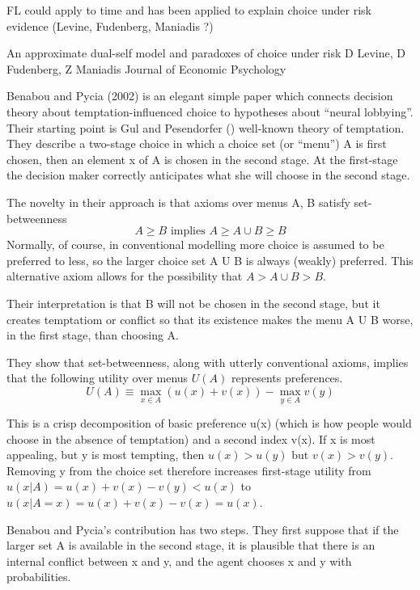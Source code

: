 \documentclass{article}
\begin{document}
FL could apply to time and has been applied to explain choice under risk evidence (Levine, Fudenberg, Maniadis ?)

An approximate dual-self model and paradoxes of choice under risk
D Levine, D Fudenberg, Z Maniadis
Journal of Economic Psychology

Benabou and Pycia (2002) is an elegant simple paper which connects decision theory about temptation-influenced choice to hypotheses about “neural lobbying”. Their starting point is Gul and Pesendorfer () well-known theory of temptation. They describe a two-stage choice in which a choice set (or “menu”) A is first chosen, then an element x of A is chosen in the second stage. At the first-stage the decision maker correctly anticipates what she will choose in the second stage. 

The novelty in their approach is that axioms over menus A, B satisfy set-betweenness
\begin{equation*}
	A \geqslant B \text { implies } A \geqslant A \cup B \geqslant B
\end{equation*}
Normally, of course, in conventional modelling more choice is assumed to be preferred to less,  so the larger choice set A U B is always (weakly) preferred. This alternative axiom allows for the possibility that $A>A \cup B>B$.

Their interpretation is that B will not be chosen in the second stage, but it creates temptatiom or conflict so that its existence makes the menu A U B worse, in the first stage, than choosing A. 

They show that set-betweenness, along with utterly conventional axioms, implies that the following utility over menus $U(A)$ represents preferences.
\begin{equation*}
	U(A) \equiv \max _{x \in A}(u(x)+v(x))-\max _{y \in A} v(y)
\end{equation*}

This is a crisp decomposition of basic preference u(x)  (which is how people would choose in the absence of temptation) and a second index v(x).  If x is most appealing, but y is most tempting, then $u(x)>u(y)$ but $v(x)>v(y)$.  Removing y from the choice set therefore increases first-stage utility from $u(x|A)= u(x)+v(x)-v(y)<u(x)$  to $u(x|A={x})=u(x)+v(x)-v(x)=u(x)$. 

Benabou and Pycia’s contribution has two steps. They first suppose that if the larger set A is available in the second stage, it is plausible that there is an internal conflict between x and y, and the agent chooses x and y with probabilities. 
\end{document}
